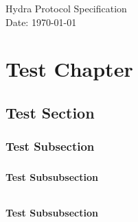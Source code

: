 \documentclass{book}
\begin{document}
\begin{titlepage}

\vspace*{\fill} %

\begin{center}

{\LARGE Hydra Protocol Specification}\\ [1.5cm]

Date: \today

\end{center}

\vspace*{\fill} %

\end{titlepage}

\tableofcontents

\chapter{Test Chapter}

\section{Test Section}
\lipsum[2]
\subsection{Test Subsection}
\lipsum[2]
\paragraph{}%
\lipsum[2]
\subsubsection{Test Subsubsection}
\lipsum[2]
\subparagraph{}%
\lipsum[2]
\subsubsection{Test Subsubsection}
\lipsum[2]
\subparagraph{}%
\lipsum[2]
\end{document}
